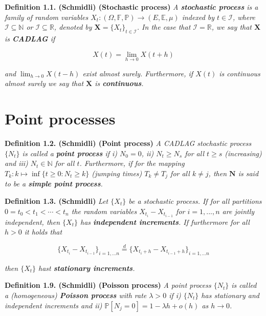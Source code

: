 \documentclass[a4paper,10pt,openany]{book}
\begin{document}
\textbf{Definition 1.1. (Schmidli) (Stochastic process)} \emph{A \textbf{stochastic process} is a family of random variables \(X_t : (\Omega,\mathbb F,\mathbb P) \to (E,\mathbb E,\mu)\) indexed by \(t\in \mathcal I\), where \(\mathcal I\subseteq \mathbb N\) or \(\mathcal I\subseteq \mathbb R\), denoted by \(\mathbf X=\{X_t\}_{t\in \mathcal I}\). In the case that \(\mathcal I=\mathbb R\), we say that \(\mathbf X\) is \textbf{CADLAG} if}

\[
X(t)=\lim_{h\to 0}X(t+h)
\]

\emph{and \(\lim_{h\to 0}X(t-h)\) exist almost surely. Furthermore, if \(X(t)\) is continuous almost surely we say that \(\mathbf X\) is \textbf{continuous}.}

\hypertarget{point-processes}{%
\section{Point processes}\label{point-processes}}

\textbf{Definition 1.2. (Schmidli) (Point process)} \emph{A CADLAG stochastic process \(\{N_t\}\) is called a \textbf{point process} if i) \(N_0=0\), ii) \(N_t\ge N_s\) for all \(t\ge s\) (increasing) and iii) \(N_t\in \mathbb N\) for all \(t\). Furthermore, if for the mapping \(T_k : k\mapsto\inf\{t\ge 0 : N_t\ge k\}\) (jumping times) \(T_k\ne T_j\) for all \(k\ne j\), then \(\mathbf N\) is said to be a \textbf{simple point process}.}

\textbf{Definition 1.3. (Schmidli)} \emph{Let \(\{X_t\}\) be a stochastic process. If for all partitions \(0=t_0<t_1<\cdots<t_n\) the random variables \(X_{t_i}-X_{t_{i-1}}\) for \(i=1,...,n\) are jointly independent, then \(\{X_t\}\) has \textbf{independent increments}. If furthermore for all \(h>0\) it holds that}

\[
\{X_{t_i}-X_{t_{i-1}}\}_{i=1,...n}\stackrel{d}{=}\{X_{t_i+h}-X_{t_{i-1}+h}\}_{i=1,...n}
\]

\emph{then \(\{X_t\}\) hast \textbf{stationary increments}.}

\textbf{Definition 1.9. (Schmidli) (Poisson process)} \emph{A point process \(\{N_t\}\) is called a (homogeneous) \textbf{Poisson process} with rate \(\lambda >0\) if i) \(\{N_t\}\) has stationary and independent increments and ii) \(\mathbb P[N_j=0]=1-\lambda h+o(h)\) as \(h\to 0\).}
\end{document}
